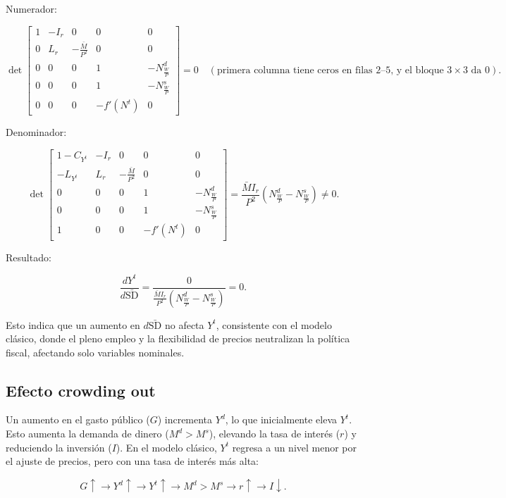 \documentclass[
  doc,
  floatsintext,
  longtable,
  a4paper,
  nolmodern,
  notxfonts,
  notimes,
  12pt,
  colorlinks=true,linkcolor=blue,citecolor=blue,urlcolor=blue]{apa7}
\begin{document}
\begin{enumerate}
  Numerador:

  \[
  \det \begin{bmatrix}
  1 & -I_r & 0 & 0 & 0 \\
  0 & L_r & -\frac{\bar{M}}{P^2} & 0 & 0 \\
  0 & 0 & 0 & 1 & -N^d_{\frac{W}{P}} \\
  0 & 0 & 0 & 1 & -N^s_{\frac{W}{P}} \\
  0 & 0 & 0 & -f'(N^t) & 0
  \end{bmatrix} = 0 \quad (\text{primera columna tiene ceros en filas 2--5, y el bloque } 3 \times 3 \text{ da } 0).
  \]

  Denominador:

  \[
  \det \begin{bmatrix}
  1 - C_{Y^t} & -I_r & 0 & 0 & 0 \\
  -L_{Y^t} & L_r & -\frac{\bar{M}}{P^2} & 0 & 0 \\
  0 & 0 & 0 & 1 & -N^d_{\frac{W}{P}} \\
  0 & 0 & 0 & 1 & -N^s_{\frac{W}{P}} \\
  1 & 0 & 0 & -f'(N^t) & 0
  \end{bmatrix} = \frac{\bar{M} I_r}{P^2} \left( N^d_{\frac{W}{P}} - N^s_{\frac{W}{P}} \right) \neq 0.
  \]

  Resultado:

  \[
  \frac{dY^t}{d\bar{\mathrm{SD}}} = \frac{0}{\frac{\bar{M} I_r}{P^2} \left( N^d_{\frac{W}{P}} - N^s_{\frac{W}{P}} \right)} = 0.
  \]

  Esto indica que un aumento en \(d\bar{\mathrm{SD}}\) no afecta
  \(Y^t\), consistente con el modelo clásico, donde el pleno empleo y la
  flexibilidad de precios neutralizan la política fiscal, afectando solo
  variables nominales.
\end{enumerate}

\subsection{Efecto crowding out}\label{efecto-crowding-out}

Un aumento en el gasto público (\(G\)) incrementa \(Y^d\), lo que
inicialmente eleva \(Y^t\). Esto aumenta la demanda de dinero
(\(M^d > M^s\)), elevando la tasa de interés (\(r\)) y reduciendo la
inversión (\(I\)). En el modelo clásico, \(Y^t\) regresa a un nivel
menor por el ajuste de precios, pero con una tasa de interés más alta:

\[
G \uparrow \rightarrow Y^d \uparrow \rightarrow Y^t \uparrow \rightarrow M^d > M^s \rightarrow r \uparrow \rightarrow I \downarrow.
\]
\end{document}
